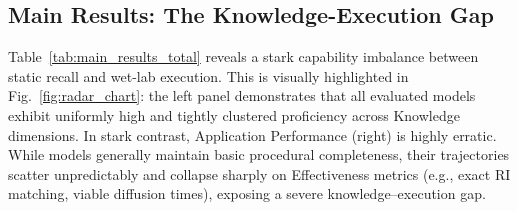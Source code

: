 \documentclass[conference]{IEEEtran}
\begin{document}
\subsection{Main Results: The Knowledge-Execution Gap}
Table~\ref{tab:main_results_total} reveals a stark capability imbalance between
static recall and wet-lab execution. This is visually highlighted in
Fig.~\ref{fig:radar_chart}: the left panel demonstrates that all evaluated
models exhibit uniformly high and tightly clustered proficiency across
Knowledge dimensions. In stark contrast, Application Performance (right) is
highly erratic. While models generally maintain basic procedural completeness,
their trajectories scatter unpredictably and collapse sharply on Effectiveness
metrics (e.g., exact RI matching, viable diffusion times), exposing a severe
knowledge--execution gap.
\end{document}
